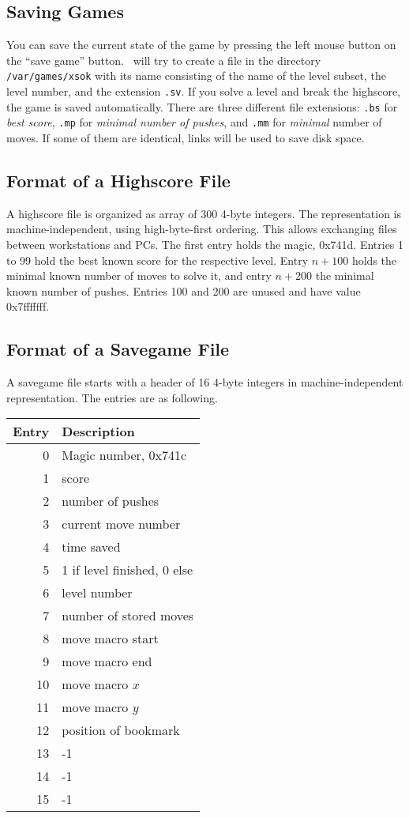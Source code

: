 \subsection{Saving Games}
You can save the current state of the game by pressing the left mouse button on
the ``save game'' button. \xsok\ will try to create a file in the
directory {\tt /var/games/xsok} with its name
consisting of the name of the level subset, the level number, and the extension
{\tt .sv}.
If you solve a level and break the highscore, the game is saved automatically.
There are three different file extensions: {\tt .bs} for {\em best score\/},
{\tt .mp} for {\em minimal number of pushes\/}, and {\tt .mm} for {\em
  minimal\/} number of moves. If some of them are identical, links will be used
to save disk space.


\subsection{Format of a Highscore File}
A highscore file is organized as array of 300 4-byte integers.
The representation is machine-independent, using high-byte-first ordering.
This allows exchanging files between workstations and PCs.
The first entry holds the magic, 0x741d.
Entries 1 to 99 hold the best known score for the respective level.
Entry $n + 100$ holds the minimal known number of moves to solve it,
and entry $n + 200$ the minimal known number of pushes.
Entries 100 and 200 are unused and have value 0x7fffffff.

\subsection{Format of a Savegame File}
A savegame file starts with a header of 16 4-byte integers in
machine-independent representation. The entries are as following.

\begin{center}
  \begin{tabular}{|r|l|}
    \hline
    Entry & Description\\
    \hline
    0 & Magic number, 0x741c\\
    1 & score \\
    2 & number of pushes\\
    3 & current move number\\
    4 & time saved\\
    5 & 1 if level finished, 0 else\\
    6 & level number\\
    7 & number of stored moves\\
    8 & move macro start \\
    9 & move macro end \\
   10 & move macro $x$ \\
   11 & move macro $y$ \\
   12 & position of bookmark \\
   13 & -1\\
   14 & -1\\
   15 & -1\\
   \hline
  \end{tabular}
\end{center}

